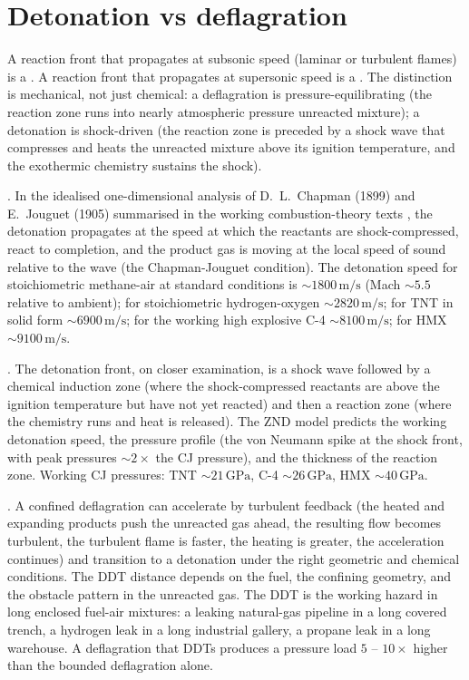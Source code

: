 \section{Detonation vs deflagration}

A reaction front that propagates at subsonic speed (laminar or
turbulent flames) is a . A reaction front that
propagates at supersonic speed is a . The
distinction is mechanical, not just chemical: a deflagration is
pressure-equilibrating (the reaction zone runs into nearly atmospheric
pressure unreacted mixture); a detonation is shock-driven (the
reaction zone is preceded by a shock wave that compresses and heats
the unreacted mixture above its ignition temperature, and the
exothermic chemistry sustains the shock).

. In the idealised one-dimensional
analysis of D.\ L.\ Chapman (1899) and E.\ Jouguet (1905) summarised
in the working combustion-theory texts \cite[ch.~6]{text:williams-combustion},
the detonation propagates at the speed at which the reactants are
shock-compressed, react to completion, and the product gas is moving
at the local speed of sound relative to the wave (the Chapman-Jouguet
condition). The detonation speed for stoichiometric methane-air at
standard conditions is $\sim 1800\,\text{m}/\text{s}$ (Mach $\sim
5.5$ relative to ambient); for stoichiometric hydrogen-oxygen $\sim
2820\,\text{m}/\text{s}$; for TNT in solid form $\sim 6900\,\text{m}/
\text{s}$; for the working high explosive C-4 $\sim 8100\,\text{m}/
\text{s}$; for HMX $\sim 9100\,\text{m}/\text{s}$.

. The
detonation front, on closer examination, is a shock wave followed by
a chemical induction zone (where the shock-compressed reactants are
above the ignition temperature but have not yet reacted) and then a
reaction zone (where the chemistry runs and heat is released). The
ZND model predicts the working detonation speed, the pressure profile
(the von Neumann spike at the shock front, with peak pressures
$\sim 2 \times$ the CJ pressure), and the thickness of the reaction
zone. Working CJ pressures: TNT $\sim 21\,\text{GPa}$, C-4 $\sim
26\,\text{GPa}$, HMX $\sim 40\,\text{GPa}$.

. A confined
deflagration can accelerate by turbulent feedback (the heated and
expanding products push the unreacted gas ahead, the resulting flow
becomes turbulent, the turbulent flame is faster, the heating is
greater, the acceleration continues) and transition to a detonation
under the right geometric and chemical conditions. The DDT distance
depends on the fuel, the confining geometry, and the obstacle pattern
in the unreacted gas. The DDT is the working hazard in long enclosed
fuel-air mixtures: a leaking natural-gas pipeline in a long covered
trench, a hydrogen leak in a long industrial gallery, a propane leak
in a long warehouse. A deflagration that DDTs produces a pressure
load $5$ -- $10\times$ higher than the bounded deflagration alone.

